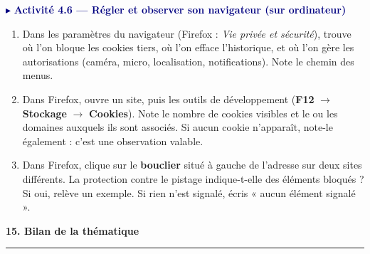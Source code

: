 \documentclass[11pt,a4paper]{article}
\newif\ifprof
\newcommand{\sect}[1]{%
  \par\addvspace{10pt}%
  {\color{navy}\Large\bfseries #1\par}\vspace{3pt}%
  {\color{navy}\hrule height 0.6pt}\vspace{6pt}}
\newcommand{\lignes}[1]{\par\foreach \i in {1,...,#1}{\vspace{8.5mm}\hrule height 0.3pt}\vspace{2mm}}
\newcommand{\reponse}[2]{\ifprof\par{\raggedright\textcolor{corr}{#2}\par}\else\lignes{#1}\fi}
\newcommand{\activite}[1]{%
  \Needspace{6\baselineskip}%
  \begin{tcolorbox}[enhanced,colback=bleuclair,colframe=navy!70,boxrule=0.5pt,arc=3pt,
    left=6pt,top=3pt,bottom=3pt,before skip=10pt,after skip=6pt]
  \textcolor{navy}{$\blacktriangleright$ \textbf{#1}}\end{tcolorbox}}
\newcommand{\ensei}[1]{\ifprof\begin{tcolorbox}[enhanced,colback=gris,colframe=corr!60,boxrule=0.5pt,arc=2pt,
  left=5pt,right=5pt,top=3pt,bottom=3pt,before skip=6pt,after skip=6pt,fontupper=\small]
  \textcolor{corr}{\textbf{Note enseignant.}} #1\end{tcolorbox}\fi}
\begin{document}
\activite{Activité 4.6 — Régler et observer son navigateur (sur ordinateur)}

\begin{enumerate}[leftmargin=*,label=\alph*)]
\item Dans les paramètres du navigateur (Firefox : \emph{Vie privée et sécurité}), trouve où l'on bloque les cookies tiers, où l'on efface l'historique, et où l'on gère les autorisations (caméra, micro, localisation, notifications). Note le chemin des menus.
\reponse{1}{Réponse variable selon le navigateur et sa version. Firefox : Paramètres $\to$ Vie privée et sécurité (protection renforcée contre le pistage, cookies et données de sites, historique, autorisations).}
\item Dans Firefox, ouvre un site, puis les outils de développement (\textbf{F12} $\to$ \textbf{Stockage} $\to$ \textbf{Cookies}). Note le nombre de cookies visibles et le ou les domaines auxquels ils sont associés. Si aucun cookie n'apparaît, note-le également : c'est une observation valable.
\reponse{2}{Résultat variable : des cookies peuvent être présents, absents ou bloqués. Les domaines affichés dans Stockage ne sont pas nécessairement identiques aux domaines de toutes les requêtes réseau.}
\item Dans Firefox, clique sur le \textbf{bouclier} situé à gauche de l'adresse sur deux sites différents. La protection contre le pistage indique-t-elle des éléments bloqués ? Si oui, relève un exemple. Si rien n'est signalé, écris « aucun élément signalé ».
\reponse{2}{Résultat variable selon les sites, la version de Firefox et les réglages. Le bouclier signale des protections, sans garantir que tous les traceurs possibles soient affichés.}
\end{enumerate}

\ensei{Les résultats d'observation (cookies visibles, domaines associés, éléments bloqués) sont variables : ne pas attendre de chiffre précis. \textbf{Distinguer} les cookies stockés, les requêtes vers des domaines tiers et les traqueurs bloqués. Certains sites qui intègrent des services externes peuvent s'afficher incomplètement lorsque leur chargement est bloqué. Les questions b) et c) peuvent rester à la maison comme prévu au minutage, mais prévoir une démonstration si les élèves ne disposent pas du même Firefox. Facultatif : comparer deux navigateurs ou moteurs sur leurs réglages de confidentialité.}

\sect{15. Bilan de la thématique}
\end{document}
